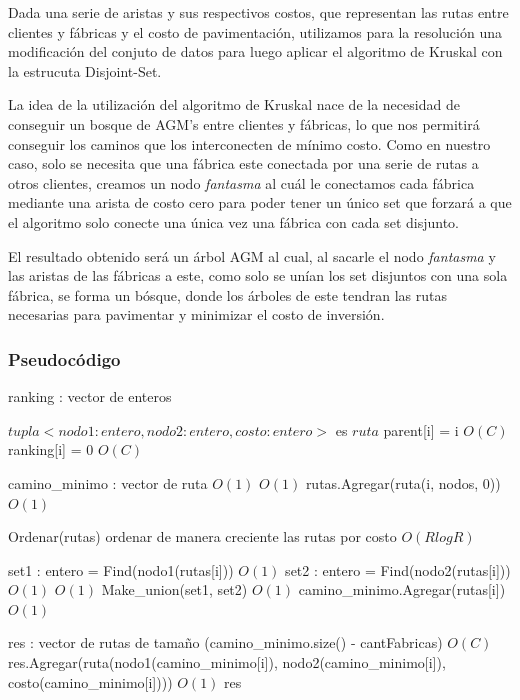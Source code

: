 \documentclass[a4paper, 10pt, twoside]{article}
\newenvironment{pseudo}[1][]{%
    \vspace{0.5em}%
    \begin{algorithmic}%
}
{%
    \end{algorithmic}%
    \vspace{0.5em}%
}
\newcommand{\Ode}[1]{\hfill $O(#1)$}
\begin{document}
Dada una serie de aristas y sus respectivos costos, que representan las rutas entre clientes y fábricas y el costo de pavimentación, utilizamos para la resolución una modificación del conjuto de datos para luego aplicar el algoritmo de Kruskal con la estrucuta Disjoint-Set.

La idea de la utilización del algoritmo de Kruskal nace de la necesidad de conseguir un bosque de AGM's entre clientes y fábricas, lo que nos permitirá conseguir los caminos que los interconecten de mínimo costo. Como en nuestro caso, solo se necesita que una fábrica este conectada por una serie de rutas a otros clientes, creamos un nodo \textit{fantasma} al cuál le conectamos cada fábrica mediante una arista de costo cero para poder tener un único set que forzará a que el algoritmo solo conecte una única vez una fábrica con cada set disjunto.

El resultado obtenido será un árbol AGM al cual, al sacarle el nodo \textit{fantasma} y las aristas de las fábricas a este, como solo se unían los set disjuntos con una sola fábrica, se forma un bósque, donde los árboles de este tendran las rutas necesarias para pavimentar y minimizar el costo de inversión.

\subsubsection{Pseudocódigo}
\begin{pseudo}

\State ranking : vector de enteros

\State $tupla <nodo1 : entero, nodo2 : entero, costo : entero>$ es $ruta$
	 parent[i] = i \EndFor						\Ode{C}
	 ranking[i] = 0 \EndFor						\Ode{C}

    \State camino\_minimo : vector de ruta									\Ode{1}
    								\Ode{1}
        \State rutas.Agregar(ruta(i, nodos, 0))								\Ode{1}
    \EndFor

	

    \State Ordenar(rutas) ordenar de manera creciente las rutas por costo \Ode{R log R}

        \State set1 : entero = Find(nodo1(rutas[i]))						\Ode{1}
        \State set2 : entero = Find(nodo2(rutas[i]))						\Ode{1}
        													\Ode{1}
            \State Make\_union(set1, set2)									\Ode{1}
            \State camino\_minimo.Agregar(rutas[i])							\Ode{1}
        \EndIf    
    \EndFor

	 

    \State res : vector de rutas de tamaño (camino\_minimo.size() - cantFabricas)   \Ode{C}
        \State res.Agregar(ruta(nodo1(camino\_minimo[i]), nodo2(camino\_minimo[i]), costo(camino\_minimo[i])))	\Ode{1}
    \EndFor
    \Return res
\EndProcedure

\end{pseudo}
\end{document}
